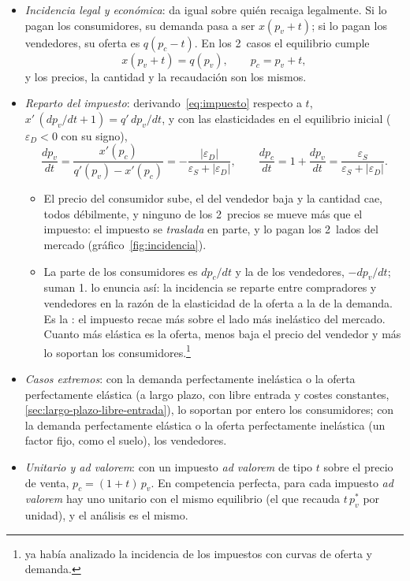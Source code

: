 \documentclass[11pt]{article}
\begin{document}
\begin{itemize}
\item \emph{Incidencia legal y económica}: da igual sobre quién recaiga legalmente. Si lo pagan los consumidores, su demanda pasa a ser $x(p_v+t)$; si lo pagan los vendedores, su oferta es $q(p_c-t)$. En los 2~casos el equilibrio cumple
  \begin{equation}
  x(p_v+t)=q(p_v),\qquad p_c=p_v+t, \label{eq:impuesto}
  \end{equation}
  y los precios, la cantidad y la recaudación son los mismos\nocite{MasColellWhinstonGreen1995}.
\item \emph{Reparto del impuesto}: derivando~\eqref{eq:impuesto} respecto a $t$, $x'\,(dp_v/dt+1)=q'\,dp_v/dt$, y con las elasticidades en el equilibrio inicial ($\varepsilon_D<0$ con su signo),
  \begin{equation}
  \frac{dp_v}{dt}=\frac{x'(p_c)}{q'(p_v)-x'(p_c)}=-\frac{\lvert\varepsilon_D\rvert}{\varepsilon_S+\lvert\varepsilon_D\rvert},\qquad
  \frac{dp_c}{dt}=1+\frac{dp_v}{dt}=\frac{\varepsilon_S}{\varepsilon_S+\lvert\varepsilon_D\rvert}. \label{eq:reparto}
  \end{equation}
  \begin{itemize}
  \item El precio del consumidor sube, el del vendedor baja y la cantidad cae, todos débilmente, y ninguno de los 2~precios se mueve más que el impuesto: el impuesto se \emph{traslada} en parte, y lo pagan los 2~lados del mercado (gráfico~\ref{fig:incidencia}).
  \item La parte de los consumidores es $dp_c/dt$ y la de los vendedores, $-dp_v/dt$; suman 1. \textcite{Dalton1922Principles} lo enuncia así: la incidencia se reparte entre compradores y vendedores en la razón de la elasticidad de la oferta a la de la demanda. Es la : el impuesto recae más sobre el lado más inelástico del mercado. Cuanto más elástica es la oferta, menos baja el precio del vendedor y más lo soportan los consumidores.\footnote{\textcite{Jenkin1872Incidence} ya había analizado la incidencia de los impuestos con curvas de oferta y demanda.}
  \end{itemize}
\item \emph{Casos extremos}: con la demanda perfectamente inelástica o la oferta perfectamente elástica (a largo plazo, con libre entrada y costes constantes, \ref{sec:largo-plazo-libre-entrada}), lo soportan por entero los consumidores; con la demanda perfectamente elástica o la oferta perfectamente inelástica (un factor fijo, como el suelo), los vendedores.
\item \emph{Unitario y ad valorem}: con un impuesto \emph{ad valorem} de tipo $t$ sobre el precio de venta, $p_c=(1+t)\,p_v$. En competencia perfecta, para cada impuesto \emph{ad valorem} hay uno unitario con el mismo equilibrio (el que recauda $t\,p_v^*$ por unidad), y el análisis es el mismo.
\end{itemize}
\end{document}
